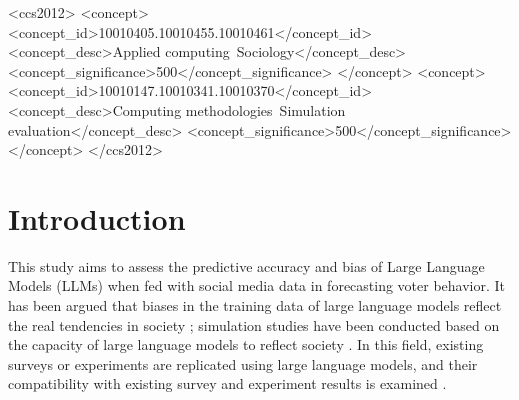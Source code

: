 \documentclass[sigconf,natbib=false]{acmart}
\begin{document}
\begin{CCSXML}
<ccs2012>
   <concept>
       <concept_id>10010405.10010455.10010461</concept_id>
       <concept_desc>Applied computing~Sociology</concept_desc>
       <concept_significance>500</concept_significance>
       </concept>
   <concept>
       <concept_id>10010147.10010341.10010370</concept_id>
       <concept_desc>Computing methodologies~Simulation evaluation</concept_desc>
       <concept_significance>500</concept_significance>
       </concept>
 </ccs2012>
\end{CCSXML}





\maketitle

\section{Introduction}
This study aims to assess the predictive accuracy and bias of Large Language Models (LLMs) when fed with social media data in forecasting voter behavior. It has been argued that biases in the training data of large language models reflect the real tendencies in society \cite{Argyle2023}; simulation studies have been conducted based on the capacity of large language models to reflect society \cite{Agnew2024}. In this field, existing surveys or experiments are replicated using large language models, and their compatibility with existing survey and experiment results is examined \cite{Agnew2024, Aher2023}.
\end{document}
